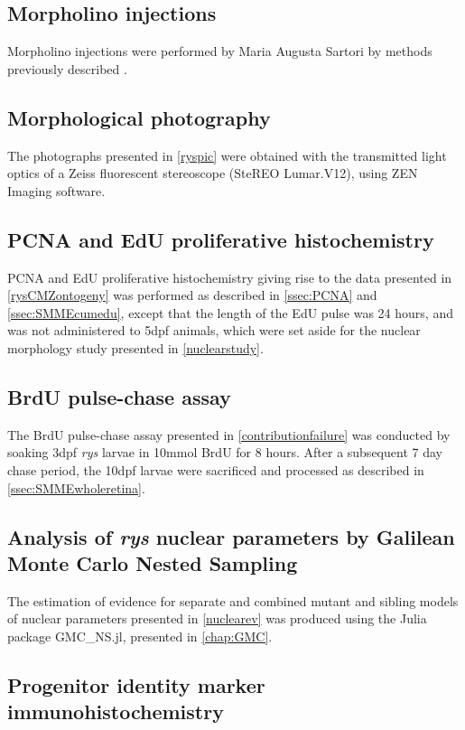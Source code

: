 \subsection{Morpholino injections}
\label{ssec:moinjxn}
Morpholino injections were performed by Maria Augusta Sartori by methods previously described \cite{Wong2015}.
 
\subsection{Morphological photography}
The photographs presented in \autoref{ryspic} were obtained with the transmitted light optics of a Zeiss fluorescent stereoscope (SteREO Lumar.V12), using ZEN Imaging software.

\subsection{PCNA and EdU proliferative histochemistry}
\label{ssec:rysPCNAEdU}
PCNA and EdU proliferative histochemistry giving rise to the data presented in \autoref{rysCMZontogeny} was performed as described in \autoref{ssec:PCNA} and \autoref{ssec:SMMEcumedu}, except that the length of the EdU pulse was 24 hours, and was not administered to 5dpf animals, which were set aside for the nuclear morphology study presented in \autoref{nuclearstudy}.

\subsection{BrdU pulse-chase assay}
\label{ssec:rysBrdUpulse}
The BrdU pulse-chase assay presented in \autoref{contributionfailure} was conducted by soaking 3dpf \textit{rys} larvae in 10\si{\milli\mole} BrdU for 8 hours. After a subsequent 7 day chase period, the 10dpf larvae were sacrificed and processed as described in \autoref{ssec:SMMEwholeretina}.

\subsection{Analysis of \textit{rys} nuclear parameters by Galilean Monte Carlo Nested Sampling}
\label{ssec:rysnucev}
The estimation of evidence for separate and combined mutant and sibling models of nuclear parameters presented in \autoref{nuclearev} was produced using the Julia package GMC\_NS.jl, presented in \autoref{chap:GMC}. 

\subsection{Progenitor identity marker immunohistochemistry}
\label{ssec:rysprogenIHC}

